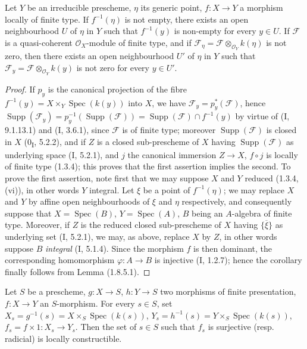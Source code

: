 \begin{corollary}[1.8.6]
\label{IV.1.8.6}
Let $Y$ be an irreducible prescheme, $\eta$ its generic point,
$f:X\to Y$ a morphism locally of finite type. If $f^{-1}(\eta)$ is not
empty, there exists an open neighbourhood $U$ of $\eta$ in $Y$ such that
$f^{-1}(y)$ is non-empty for every $y\in U$. If $\mathscr F$ is a
quasi-coherent $\mathcal O_X$-module of finite type, and if
$\mathscr F_\eta=\mathscr F\otimes_{\mathcal O_Y}k(\eta)$ is not zero,
then there exists an open neighbourhood $U'$ of $\eta$ in $Y$ such that
$\mathscr F_y=\mathscr F\otimes_{\mathcal O_Y}k(y)$ is not zero for
every $y\in U'$.
\end{corollary}

\begin{proof}
If $p_y$ is the canonical projection of the fibre
$f^{-1}(y)=X\times_Y\operatorname{Spec}(k(y))$ into $X$, we have
$\mathscr F_y=p_y^*(\mathscr F)$, hence
$\operatorname{Supp}(\mathscr F_y)=p_y^{-1}(\operatorname{Supp}(\mathscr F))
=\operatorname{Supp}(\mathscr F)\cap f^{-1}(y)$ by virtue of (I, 9.1.13.1) and
(I, 3.6.1), since $\mathscr F$ is of finite type; moreover
$\operatorname{Supp}(\mathscr F)$ is closed in $X$ (0\textsubscript{I},
5.2.2), and if $Z$ is a closed sub-prescheme of $X$ having
$\operatorname{Supp}(\mathscr F)$ as underlying space (I, 5.2.1), and $j$ the
canonical immersion $Z\to X$, $f\circ j$ is locally of finite type (1.3.4);
this proves that the first assertion implies the second. To prove the
first assertion, note first that we may suppose $X$ and $Y$
reduced (1.3.4, (vi)), in other words $Y$ integral. Let $\xi$ be a point of
$f^{-1}(\eta)$; we may replace $X$ and $Y$ by affine open neighbourhoods of
$\xi$ and $\eta$ respectively, and consequently suppose that
$X=\operatorname{Spec}(B)$, $Y=\operatorname{Spec}(A)$, $B$ being an
$A$-algebra of finite type. Moreover, if $Z$ is the reduced closed
sub-prescheme of $X$ having $\overline{\{\xi\}}$ as underlying set
(I, 5.2.1), we may, as above, replace $X$ by $Z$, in other words suppose $B$
\emph{integral} (I, 5.1.4). Since the morphism $f$ is then dominant,
the corresponding homomorphism $\varphi:A\to B$ is injective (I, 1.2.7);
hence the corollary finally follows from Lemma (1.8.5.1).
\end{proof}


\begin{proposition}[1.8.7]
\label{IV.1.8.7}
Let $S$ be a prescheme, $g:X\to S$, $h:Y\to S$ two morphisms of finite
presentation, $f:X\to Y$ an $S$-morphism. For every $s\in S$, set
$X_s=g^{-1}(s)=X\times_S\operatorname{Spec}(k(s))$,
$Y_s=h^{-1}(s)=Y\times_S\operatorname{Spec}(k(s))$,
$f_s=f\times 1:X_s\to Y_s$. Then the set of $s\in S$ such that $f_s$
is surjective (resp. radicial) is locally constructible.
\end{proposition}

